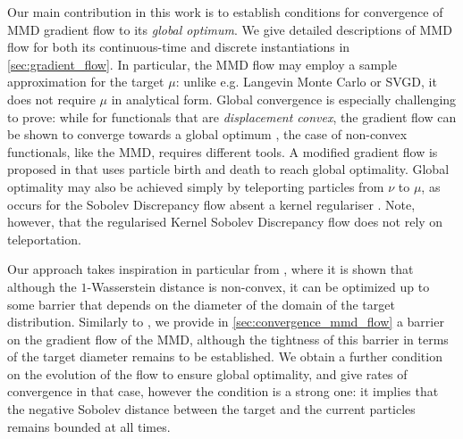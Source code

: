  



Our main contribution in this work is to establish conditions for convergence of MMD gradient flow to its {\em global optimum}.
We give detailed descriptions of  MMD flow for both its continuous-time and discrete instantiations in \cref{sec:gradient_flow}.
In particular, the MMD flow may employ a sample approximation for the target $\mu$: unlike e.g. Langevin Monte Carlo or SVGD,
it does not require  $\mu$ in analytical form.
Global convergence is especially challenging to prove: while for functionals that are \textit{displacement convex}, the gradient flow can be shown to converge towards a global optimum \cite{ambrosio2008gradient}, the case of non-convex functionals, like the MMD, requires different tools.
 A modified gradient flow is proposed in \cite{rotskoff2019global} that uses particle birth and death to reach global optimality.
Global optimality may also be achieved simply by teleporting particles from $\nu$ to $\mu$, as occurs for the Sobolev Discrepancy flow absent a kernel regulariser \cite[Theorem 4, Appendix D]{Mroueh:2019}.
Note, however, that the regularised Kernel Sobolev Discrepancy flow does not rely on teleportation.


\iffalse
We note the claim of \cite[Proposition 3, Appendix B.1]{Mroueh:2019} that global convergence may be achieved for a flow on the Kernel Sobolev Discrepancy, with no barrier (the regularised KSD is related to the MMD; see Introduction). This claim requires an assumption \cite[Assumption A]{Mroueh:2019} that amounts to assuming that the algorithm is not in a local minimum, however.\agnote{maybe add a short appendix section - although  it's not urgent.}

\fi



Our approach takes  inspiration in particular from \cite{Bottou:2017}, where it is shown that although the $1$-Wasserstein distance is non-convex, it can be optimized up to some barrier that depends on the diameter of the domain of the target distribution.
Similarly to \cite{Bottou:2017}, we provide in \cref{sec:convergence_mmd_flow} a barrier on the gradient flow of the MMD, although
the tightness of this barrier in terms of the target diameter remains to be established.
We  obtain a further condition on the evolution of the flow to ensure global optimality, and give rates of convergence in that case, however
the condition is a strong one: it implies that the negative Sobolev distance between the target and the current particles remains bounded at all times.

